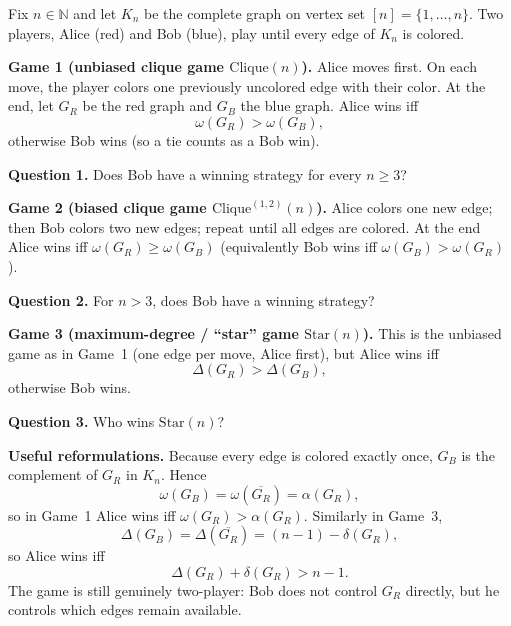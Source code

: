 
Fix $n\in\mathbb{N}$ and let $K_n$ be the complete graph on vertex set $[n]=\{1,\dots,n\}$.  Two players, Alice (red) and Bob (blue), play until every edge of $K_n$ is colored.

\medskip
\noindent\textbf{Game 1 (unbiased clique game $\mathrm{Clique}(n)$).}
Alice moves first. On each move, the player colors one previously uncolored edge with their color.  At the end, let $G_R$ be the red graph and $G_B$ the blue graph.  Alice wins iff
\[
\omega(G_R) > \omega(G_B),
\]
otherwise Bob wins (so a tie counts as a Bob win).

\medskip
\noindent\textbf{Question 1.} Does Bob have a winning strategy for every $n\ge 3$?

\medskip
\noindent\textbf{Game 2 (biased clique game $\mathrm{Clique}^{(1,2)}(n)$).}
Alice colors one new edge; then Bob colors two new edges; repeat until all edges are colored.
At the end Alice wins iff $\omega(G_R) \ge \omega(G_B)$ (equivalently Bob wins iff $\omega(G_B) > \omega(G_R)$).

\medskip
\noindent\textbf{Question 2.} For $n>3$, does Bob have a winning strategy?

\medskip
\noindent\textbf{Game 3 (maximum-degree / ``star'' game $\mathrm{Star}(n)$).}
This is the unbiased game as in Game~1 (one edge per move, Alice first), but Alice wins iff
\[
\Delta(G_R) > \Delta(G_B),
\]
otherwise Bob wins.

\medskip
\noindent\textbf{Question 3.} Who wins $\mathrm{Star}(n)$?

\medskip
\noindent\textbf{Useful reformulations.}
Because every edge is colored exactly once, $G_B$ is the complement of $G_R$ in $K_n$.
Hence
\[
\omega(G_B)=\omega(\overline{G_R})=\alpha(G_R),
\]
so in Game~1 Alice wins iff $\omega(G_R) > \alpha(G_R)$.
Similarly in Game~3,
\[
\Delta(G_B)=\Delta(\overline{G_R}) = (n-1) - \delta(G_R),
\]
so Alice wins iff
\[
\Delta(G_R) + \delta(G_R) > n-1.
\]
The game is still genuinely two-player: Bob does not control $G_R$ directly, but he controls which edges remain available.
